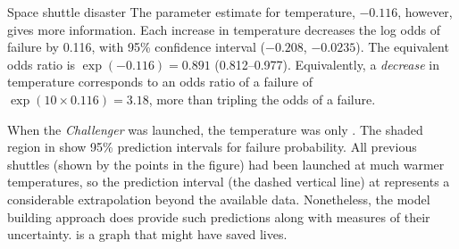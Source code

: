 \documentclass[11pt]{book}
\begin{document}
\begin{Example}[nasa0]{Space shuttle disaster}
The parameter estimate for temperature, $-0.116$, however, gives more information.  Each  increase in temperature decreases the log odds
of failure by 0.116, with 95\% confidence interval ($-0.208$, $-0.0235$).  The equivalent odds ratio is $\exp(-0.116) = 0.891$ (0.812--0.977).
Equivalently, a  \emph{decrease} in temperature corresponds to
an odds ratio of a failure of 
$\exp(10 \times 0.116) = 3.18$, more than tripling the odds of a failure.

When the \emph{Challenger} was launched, the temperature was only .
The shaded region in  show 95\% prediction intervals
for failure probability.  All previous shuttles (shown by the points
in the figure) had been launched at much warmer temperatures, so the
prediction interval (the dashed vertical line)
at  represents a considerable extrapolation
beyond the available data.  Nonetheless, the model building approach
does provide such predictions along with measures of their uncertainty.
 is a graph
that might have saved lives.

\end{Example}

\end{document}
